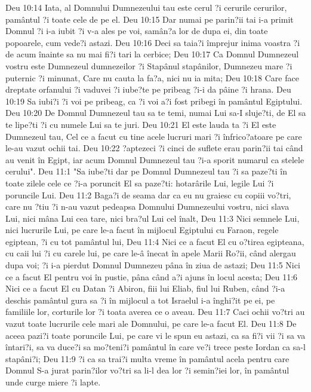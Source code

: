 Deu 10:14  Iata, al Domnului Dumnezeului tau este cerul ?i cerurile cerurilor, pamântul ?i toate cele de pe el.
Deu 10:15  Dar numai pe parin?ii tai i-a primit Domnul ?i i-a iubit ?i v-a ales pe voi, samân?a lor de dupa ei, din toate popoarele, cum vede?i astazi.
Deu 10:16  Deci sa taia?i împrejur inima voastra ?i de acum înainte sa nu mai fi?i tari la cerbice;
Deu 10:17  Ca Domnul Dumnezeul vostru este Dumnezeul dumnezeilor ?i Stapânul stapânilor, Dumnezeu mare ?i puternic ?i minunat, Care nu cauta la fa?a, nici nu ia mita;
Deu 10:18  Care face dreptate orfanului ?i vaduvei ?i iube?te pe pribeag ?i-i da pâine ?i hrana.
Deu 10:19  Sa iubi?i ?i voi pe pribeag, ca ?i voi a?i fost pribegi în pamântul Egiptului.
Deu 10:20  De Domnul Dumnezeul tau sa te temi, numai Lui sa-I sluje?ti, de El sa te lipe?ti ?i cu numele Lui sa te juri.
Deu 10:21  El este lauda ta ?i El este Dumnezeul tau, Cel ce a facut cu tine acele lucruri mari ?i înfrico?atoare pe care le-au vazut ochii tai.
Deu 10:22  ?aptezeci ?i cinci de suflete erau parin?ii tai când au venit în Egipt, iar acum Domnul Dumnezeul tau ?i-a sporit numarul ca stelele cerului".
Deu 11:1  "Sa iube?ti dar pe Domnul Dumnezeul tau ?i sa paze?ti în toate zilele cele ce ?i-a poruncit El sa paze?ti: hotarârile Lui, legile Lui ?i poruncile Lui.
Deu 11:2  Baga?i de seama dar ca eu nu graiesc cu copiii vo?tri, care nu ?tiu ?i n-au vazut pedeapsa Domnului Dumnezeului vostru, nici slava Lui, nici mâna Lui cea tare, nici bra?ul Lui cel înalt,
Deu 11:3  Nici semnele Lui, nici lucrurile Lui, pe care le-a facut în mijlocul Egiptului cu Faraon, regele egiptean, ?i cu tot pamântul lui,
Deu 11:4  Nici ce a facut El cu o?tirea egipteana, cu caii lui ?i cu carele lui, pe care le-â înecat în apele Marii Ro?ii, când alergau dupa voi; ?i i-a pierdut Domnul Dumnezeu pâna în ziua de astazi;
Deu 11:5  Nici ce a facut El pentru voi în pustie, pâna când a?i ajuns în locul acesta;
Deu 11:6  Nici ce a facut El cu Datan ?i Abiron, fiii lui Eliab, fiul lui Ruben, când ?i-a deschis pamântul gura sa ?i în mijlocul a tot Israelul i-a înghi?it pe ei, pe familiile lor, corturile lor ?i toata averea ce o aveau.
Deu 11:7  Caci ochii vo?tri au vazut toate lucrurile cele mari ale Domnului, pe care le-a facut El.
Deu 11:8  De aceea pazi?i toate poruncile Lui, pe care vi le spun eu astazi, ca sa fi?i vii ?i sa va întari?i, sa va duce?i sa mo?teni?i pamântul în care ve?i trece peste Iordan ca sa-l stapâni?i;
Deu 11:9  ?i ca sa trai?i multa vreme în pamântul acela pentru care Domnul S-a jurat parin?ilor vo?tri sa li-l dea lor ?i semin?iei lor, în pamântul unde curge miere ?i lapte.
